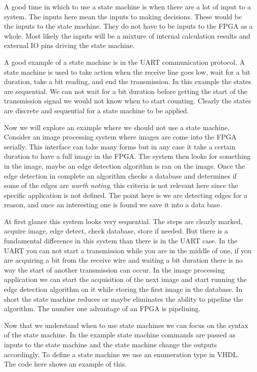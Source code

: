 A good time in which to use a state machine is when there are a lot of input to a system. The inputs here mean the inputs to making decisions. These would be the inputs to the state machine. They do not have to be inputs to the \ac{FPGA} as a whole. Most likely the inputs will be a mixture of internal calculation results and external \ac{IO} pins driving the state machine. 

A good example of a state machine is in the \ac{UART} communication protocol. A state machine is used to take action when the receive line goes low, wait for a bit duration, take a bit reading, and end the transmission. In this example the states are sequential. We can not wait for a bit duration before getting the start of the transmission signal we would not know when to start counting. Clearly the states are discrete and sequential for a state machine to be applied. 

Now we will explore an example where we should not use a state machine. Consider an image processing system where images are come into the \ac{FPGA} serially. This interface can take many forms but in any case it take a certain duration to have a full image in the \ac{FPGA}. The system then looks for something in the image, maybe an edge detection algorithm is ran on the image. Once the edge detection in complete an algorithm checks a database and determines if some of the edges are \emph{worth noting}, this criteria is not relevant here since the specific application is not defined. The point here is we are detecting edges for a reason, and once an interesting one is found we save it into a data base. 

At first glance this system looks very sequential. The steps are clearly marked, acquire image, edge detect, check database, store if needed. But there is a fundamental difference in this system than there is in the \ac{UART} case. In the \ac{UART} you can not start a transmission while you are in the middle of one, if you are acquiring a bit from the receive wire and waiting a bit duration there is no way the start of another transmission can occur. In the image processing application we can start the acquisition of the next image and start running the edge detection algorithm on it while storing the first image in the database. In short the state machine reduces or maybe eliminates the ability to pipeline the algorithm. The number one advantage of an \ac{FPGA} is pipelining.

Now that we understand when to use state machines we can focus on the syntax of the state machine. In the example state machine commands are passed as inputs to the state machine and the state machine change the outputs accordingly. To define a state machine we use an enumeration type in \ac{VHDL}. The code here shows an example of this. 

